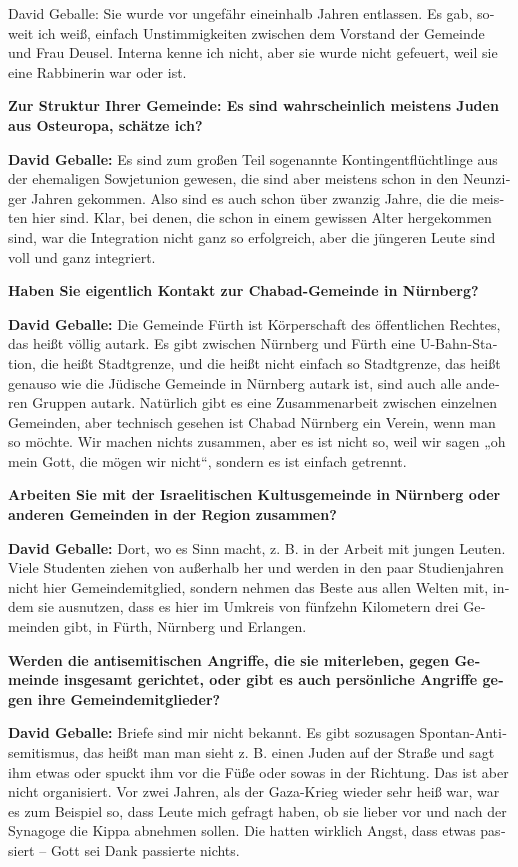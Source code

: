 \begin{otherlanguage}{ngerman}
David Geballe: Sie wurde vor ungefähr eineinhalb Jahren entlassen. Es gab, soweit ich weiß, einfach Unstimmigkeiten zwischen dem Vorstand der Gemeinde und Frau Deusel. Interna kenne ich nicht, aber sie wurde nicht gefeuert, weil sie eine Rabbinerin war oder ist. 

\textbf{Zur Struktur Ihrer Gemeinde: Es sind wahrscheinlich meistens Juden aus Osteuropa, schätze ich?}

\textbf{David Geballe:} Es sind zum großen Teil sogenannte Kontingentflüchtlinge aus der ehemaligen Sowjetunion gewesen, die sind aber meistens schon in den Neunziger Jahren gekommen. Also sind es auch schon über zwanzig Jahre, die die meisten hier sind. Klar, bei denen, die schon in einem gewissen Alter hergekommen sind, war die Integration nicht ganz so erfolgreich, aber die jüngeren Leute sind voll und ganz integriert. 

\textbf{Haben Sie eigentlich Kontakt zur Chabad-Gemeinde in Nürnberg?}

\textbf{David Geballe:} Die Gemeinde Fürth ist Körperschaft des öffentlichen Rechtes, das heißt völlig autark. Es gibt zwischen Nürnberg und Fürth eine U-Bahn-Station, die heißt Stadtgrenze, und die heißt nicht einfach so Stadtgrenze, das heißt genauso wie die Jüdische Gemeinde in Nürnberg autark ist, sind auch alle anderen Gruppen autark. Natürlich gibt es eine Zusammenarbeit zwischen einzelnen Gemeinden, aber technisch gesehen ist Chabad Nürnberg ein Verein, wenn man so möchte. Wir machen nichts zusammen, aber es ist nicht so, weil wir sagen „oh mein Gott, die mögen wir nicht“, sondern es ist einfach getrennt. 

\textbf{Arbeiten Sie mit der Israelitischen Kultusgemeinde in Nürnberg oder anderen Gemeinden in der Region zusammen?} 

\textbf{David Geballe:} Dort, wo es Sinn macht, z. B. in der Arbeit mit jungen Leuten. Viele Studenten ziehen von außerhalb her und werden in den paar Studienjahren nicht hier Gemeindemitglied, sondern nehmen das Beste aus allen Welten mit, indem sie ausnutzen, dass es hier im Umkreis von fünfzehn Kilometern drei Gemeinden gibt, in Fürth, Nürnberg und Erlangen. 

\textbf{Werden die antisemitischen Angriffe, die sie miterleben, gegen Gemeinde insgesamt gerichtet, oder gibt es auch persönliche Angriffe gegen ihre Gemeindemitglieder?} 

\textbf{David Geballe:} Briefe sind mir nicht bekannt. Es gibt sozusagen Spontan-Antisemitismus, das heißt man man sieht z. B. einen Juden auf der Straße und sagt ihm etwas oder spuckt ihm vor die Füße oder sowas in der Richtung. Das ist aber nicht organisiert. Vor zwei Jahren, als der Gaza-Krieg wieder sehr heiß war, war es zum Beispiel so, dass Leute mich gefragt haben, ob sie lieber vor und nach der Synagoge die Kippa abnehmen sollen. Die hatten wirklich Angst, dass etwas passiert – Gott sei Dank passierte nichts. 


\end{otherlanguage}
